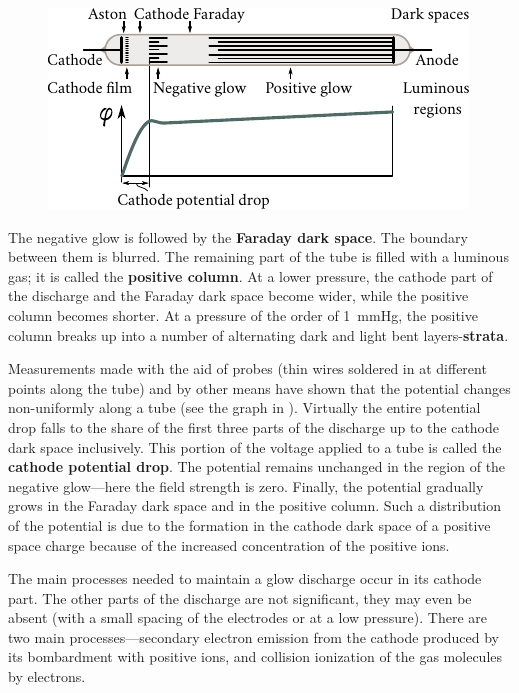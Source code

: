 \begin{figure}[t]
	\begin{center}
		\includegraphics[scale=1]{figures/ch_12/fig_12_8.pdf}
		\caption[]{}
		\label{fig:12_8}
	\end{center}
	\vspace{-0.8cm}
\end{figure}

The negative glow is followed by the \textbf{Faraday dark space}.
The boundary between them is blurred.
The remaining part of the tube is filled with a luminous gas; it is called the \textbf{positive column}.
At a lower pressure, the cathode part of the discharge and the Faraday dark space become wider, while the positive column becomes shorter.
At a pressure of the order of \SI{1}{\mmHg}, the positive column breaks up into a number of alternating dark and light bent layers-\textbf{strata}.

Measurements made with the aid of probes (thin wires soldered in at different points along the tube) and by other means have shown that the potential changes non-uniformly along a tube (see the graph in ).
Virtually the entire potential drop falls to the share of the first three parts of the discharge up to the cathode dark space inclusively.
This portion of the voltage applied to a tube is called the \textbf{cathode potential drop}.
The potential remains unchanged in the region of the negative glow---here the field strength is zero. Finally, the potential gradually grows in the Faraday dark space and in the positive column.
Such a distribution of the potential is due to the formation in the cathode dark space of a positive space charge because of the increased concentration of the positive ions.

The main processes needed to maintain a glow discharge occur in its cathode part.
The other parts of the discharge are not significant, they may even be absent (with a small spacing of the electrodes or at a low pressure).
There are two main processes---secondary electron emission from the cathode produced by its bombardment with positive ions, and collision ionization of the gas molecules by electrons.

